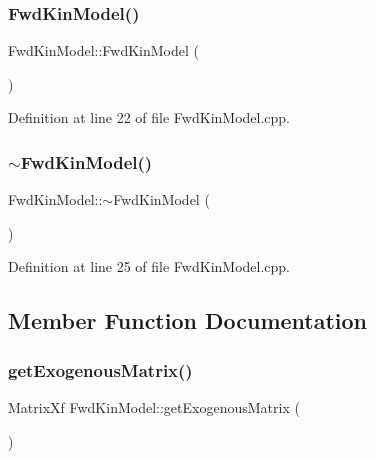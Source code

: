 \subsubsection{\texorpdfstring{Fwd\+Kin\+Model()}{FwdKinModel()}}
{\footnotesize\ttfamily Fwd\+Kin\+Model\+::\+Fwd\+Kin\+Model (\begin{DoxyParamCaption}{ }\end{DoxyParamCaption})\hspace{0.3cm}{\ttfamily [noexcept]}}



Definition at line 22 of file Fwd\+Kin\+Model.\+cpp.

\mbox{\label{classFwdKinModel_afb77abf94a9f8b8379b6e71b4ca0f3c1}} 
\subsubsection{\texorpdfstring{$\sim$\+Fwd\+Kin\+Model()}{~FwdKinModel()}}
{\footnotesize\ttfamily Fwd\+Kin\+Model\+::$\sim$\+Fwd\+Kin\+Model (\begin{DoxyParamCaption}{ }\end{DoxyParamCaption})\hspace{0.3cm}{\ttfamily [noexcept]}}



Definition at line 25 of file Fwd\+Kin\+Model.\+cpp.



\subsection{Member Function Documentation}
\mbox{\label{classFwdKinModel_ac8ed4e8a52f5ff33cc158c80c6cf083e}} 
\subsubsection{\texorpdfstring{get\+Exogenous\+Matrix()}{getExogenousMatrix()}}
{\footnotesize\ttfamily Matrix\+Xf Fwd\+Kin\+Model\+::get\+Exogenous\+Matrix (\begin{DoxyParamCaption}{ }\end{DoxyParamCaption})\hspace{0.3cm}{\ttfamily [override]}}



